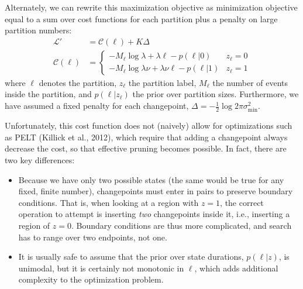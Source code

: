 \documentclass[11pt]{article}
\begin{document}
Alternately, we can rewrite this maximization objective as minimization objective equal to a sum over cost functions for each partition plus a penalty on large partition numbers:
\begin{align}
    \mathcal{L}' &= \mathcal{C}(\ell) + K \Delta \\
    \mathcal{C}(\ell) &=
    \begin{cases}
        -M_\ell \log \lambda + \lambda \ell - p(\ell|0) & z_\ell = 0 \\
        -M_\ell \log \lambda\nu + \lambda\nu \ell - p(\ell|1) & z_\ell = 1
    \end{cases}
\end{align}
where $\ell$ denotes the partition, $z_\ell$ the partition label, $M_\ell$ the number of events inside the partition, and $p(\ell|z_\ell)$ the prior over partition sizes. Furthermore, we have assumed a fixed penalty for each changepoint, $\Delta = -\frac{1}{2}\log 2\pi \sigma^2_\mathrm{min}$.

Unfortunately, this cost function does not (naively) allow for optimizations such as PELT (Killick et al., 2012), which require that adding a changepoint always decrease the cost, so that effective pruning becomes possible. In fact, there are two key differences:
\begin{itemize}
    \item Because we have only two possible states (the same would be true for any fixed, finite number), changepoints must enter in pairs to preserve boundary conditions. That is, when looking at a region with $z = 1$, the correct operation to attempt is inserting \emph{two} changepoints inside it, i.e., inserting a region of $z = 0$. Boundary conditions are thus more complicated, and search has to range over two endpoints, not one.

    \item It is usually safe to assume that the prior over state durations, $p(\ell|z)$, is unimodal, but it is certainly not monotonic in $\ell$, which adds additional complexity to the optimization problem.
\end{itemize}
\end{document}
